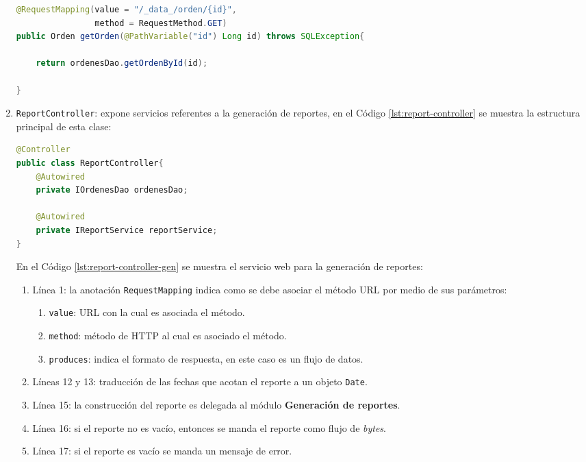 \begin{enumerate}
\begin{lstlisting}[language=Java, caption={Servicio web para obtener una orden de reposición.}, captionpos=b, label={lst:get-orden-data-controller}]
@RequestMapping(value = "/_data_/orden/{id}",
				method = RequestMethod.GET)
public Orden getOrden(@PathVariable("id") Long id) throws SQLException{

	return ordenesDao.getOrdenById(id);

}
\end{lstlisting}

	\item \texttt{ReportController}: expone servicios referentes a la generación de reportes, en el Código \ref{lst:report-controller} se muestra la estructura principal de esta clase:
\begin{lstlisting}[language=Java, caption={Controlador para exponer servicios web de generación de reportes.}, captionpos=b, label={lst:report-controller}]
@Controller
public class ReportController{
	@Autowired
	private IOrdenesDao ordenesDao;
	
	@Autowired
	private IReportService reportService;
}
\end{lstlisting}

	En el Código \ref{lst:report-controller-gen} se muestra el servicio web para la generación de reportes:
	\begin{enumerate}
		\item Línea 1: la anotación \texttt{RequestMapping} indica como se debe asociar el método URL por medio de sus parámetros:
		\begin{enumerate}
			\item \texttt{value}: URL con la cual es asociada el método.
			\item \texttt{method}: método de HTTP al cual es asociado el método.
			\item \texttt{produces}: indica el formato de respuesta, en este caso es un flujo de datos.
		\end{enumerate}
		\item Líneas 12 y 13: traducción de las fechas que acotan el reporte a un objeto \texttt{Date}.
		\item Línea 15: la construcción del reporte es delegada al módulo \textbf{Generación de reportes}.
		\item Línea 16: si el reporte no es vacío, entonces se manda el reporte como flujo de \textit{bytes}.
		\item Línea 17: si el reporte es vacío se manda un mensaje de error.
	\end{enumerate}


\end{enumerate}
